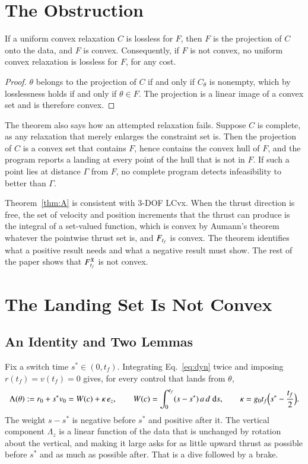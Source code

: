 \section{The Obstruction}\label{sec:obstruction}
\begin{theorem}\label{thm:A}
If a uniform convex relaxation $C$ is lossless for $F$, then $F$ is the projection of $C$ onto the data, and $F$ is convex.
Consequently, if $F$ is not convex, no uniform convex relaxation is lossless for $F$, for any cost.
\end{theorem}
\begin{proof}
$\theta$ belongs to the projection of $C$ if and only if $C_\theta$ is nonempty, which by losslessness holds if and only if
$\theta\in F$. The projection is a linear image of a convex set and is therefore convex.
\end{proof}

The theorem also says how an attempted relaxation fails. Suppose $C$ is complete, as any relaxation that merely enlarges
the constraint set is. Then the projection of $C$ is a convex set that contains $F$, hence contains the convex hull of $F$,
and the program reports a landing at every point of the hull that is not in $F$. If such a point lies at distance $\Gamma$
from $F$, no complete program detects infeasibility to better than $\Gamma$.

Theorem~\ref{thm:A} is consistent with 3-DOF LCvx. When the thrust direction is free, the set of velocity and position
increments that the thrust can produce is the integral of a set-valued function, which is convex by Aumann's theorem
\cite{aumann1965} whatever the pointwise thrust set is, and $F_{t_f}$ is convex. The theorem identifies what a positive result
needs and what a negative result must show. The rest of the paper shows that $F^{X}_{t_f}$ is not convex.

\section{The Landing Set Is Not Convex}\label{sec:dive}
\subsection{An Identity and Two Lemmas}
Fix a switch time $s^*\in(0,t_f)$. Integrating Eq.~\eqref{eq:dyn} twice and imposing $r(t_f)=v(t_f)=0$ gives, for every
control that lands from $\theta$,
\begin{equation}\label{eq:lambda}
\Lambda(\theta):=r_0+s^*v_0=W(c)+\kappa\,e_z,\qquad W(c)=\int_0^{t_f}(s-s^*)\,a\,d\;\mathrm ds,\qquad
\kappa=g_0t_f\Bigl(s^*-\frac{t_f}{2}\Bigr).
\end{equation}
The weight $s-s^*$ is negative before $s^*$ and positive after it. The vertical component $\Lambda_z$ is a linear function
of the data that is unchanged by rotation about the vertical, and making it large asks for as little upward thrust as
possible before $s^*$ and as much as possible after. That is a dive followed by a brake.


